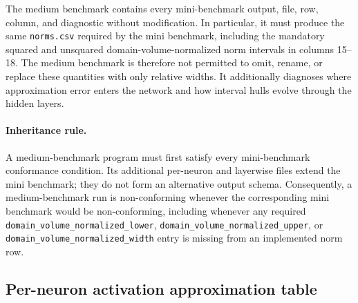 \documentclass[11pt]{article}
\begin{document}
The medium benchmark contains every mini-benchmark output, file, row, column,
and diagnostic without modification.  In particular, it must produce the same
\texttt{norms.csv} required by the mini benchmark, including the mandatory
squared and unsquared domain-volume-normalized norm intervals in columns
15--18.  The medium benchmark is therefore not permitted to omit, rename, or
replace these quantities with only relative widths.  It additionally diagnoses
where approximation error enters the network and how interval hulls evolve
through the hidden layers.

\paragraph{Inheritance rule.}
A medium-benchmark program must first satisfy every mini-benchmark conformance
condition.  Its additional per-neuron and layerwise files extend the mini
benchmark; they do not form an alternative output schema.  Consequently, a
medium-benchmark run is non-conforming whenever the corresponding mini
benchmark would be non-conforming, including whenever any required
\texttt{domain\_volume\_normalized\_lower},
\texttt{domain\_volume\_normalized\_upper}, or
\texttt{domain\_volume\_normalized\_width} entry is missing from an
implemented norm row.

\subsection{Per-neuron activation approximation table}
\end{document}
